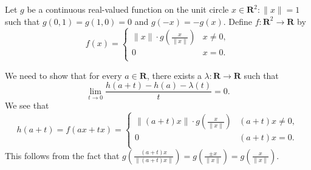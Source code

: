 Let $g$ be a continuous real-valued function on the unit
circle ${x\in \mathbf{R}^2:\|x\|=1}$ such that $g(0,1)
=g(1,0) =0$ and $g(-x)=-g(x)$. Define $f:\mathbf{R}^2
\to \mathbf{R}$ by
$$f(x)=
\begin{cases}
    \|x\|\cdot g\left(\frac{x}{\|x\|}\right) & x \neq 0,\\
    0 & x =0.\\        
\end{cases}$$
    
\begin{questions}

    \begin{solution}
        We need to show that for every $a\in \mathbf{R}$, there
        exists a $\lambda:\mathbf{R}\to\mathbf{R}$ such that
        $$\lim_{t\to 0}{\frac{h(a+t)-h(a)-\lambda(t)}{t}} = 0.$$
        We see that
        $$h(a+t)=f(ax+tx)=
        \begin{cases}
            \|(a+t)x\|\cdot g\left(\frac{x}
            {\|x\|}\right) & (a+t)x\neq 0,\\
            0 & (a+t)x=0.\\
        \end{cases}$$
        This follows from the fact that $g\left(\frac{(a+t)x}
        {\|(a+t)x\|}\right)=g\left(\frac{\pm x}{\|x\|}\right)
        =g\left(\frac{x}{\|x\|}\right).$
    \end{solution}
    
\end{questions}
